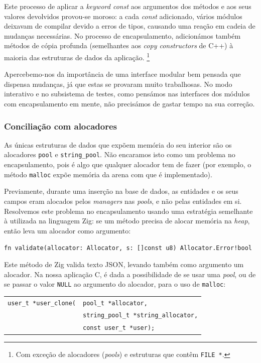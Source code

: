 \documentclass[11pt, a4paper]{article}
\begin{document}
Este processo de aplicar a \emph{keyword const} aos argumentos dos métodos e aos seus valores
devolvidos provou-se moroso: a cada \emph{const} adicionado, vários módulos deixavam de compilar
devido a erros de tipos, causando uma reação em cadeia de mudanças necessárias. No processo de
encapsulamento, adicionámos também métodos de cópia profunda (semelhantes aos \emph{copy
constructors} de C++) à maioria das estruturas de dados da aplicação. \footnote{Com exceção de
alocadores (\emph{pools}) e estruturas que contêm \texttt{FILE *}.}

Apercebemo-nos da importância de uma interface modular bem pensada que dispensa mudanças, já que
estas se provaram muito trabalhosas. No modo interativo e no subsistema de testes, como pensámos nas
interfaces dos módulos com encapsulamento em mente, não precisámos de gastar tempo na sua correção.

\subsubsection{Conciliação com alocadores}
\label{sec:allocator-conciliation}

As únicas estruturas de dados que expõem memória do seu interior são os alocadores \texttt{pool} e
\texttt{string\_pool}. Não encaramos isto como um problema no encapsulamento, pois é algo que
qualquer alocador tem de fazer (por exemplo, o método \texttt{malloc} expõe memória da arena com
que é implementado).

Previamente, durante uma inserção na base de dados, as entidades e os seus campos eram alocados
pelos \emph{managers} nas \emph{pools}, e não pelas entidades em si. Resolvemos este problema no
encapsulamento usando uma estratégia semelhante à utilizada na linguagem Zig: se um método precisa
de alocar memória na \emph{heap}, então leva um alocador como argumento:

\begin{center}
    \texttt{fn validate(allocator: Allocator, s: []const u8) Allocator.Error!bool}
\end{center}

Este método de Zig valida texto JSON, levando também como argumento um alocador. Na nossa aplicação
C, é dada a possibilidade de se usar uma \emph{pool}, ou de se passar o valor \texttt{NULL} ao
argumento do alocador, para o uso de \texttt{malloc}:

\begin{center}
    \begin{tabular}{rl}
        \texttt{user\_t *user\_clone(}&\hspace{-3mm}\texttt{pool\_t *allocator,} \\
        &\hspace{-3mm}\texttt{string\_pool\_t *string\_allocator,} \\
        &\hspace{-3mm}\texttt{const user\_t *user);}
    \end{tabular}
\end{center}
\end{document}

